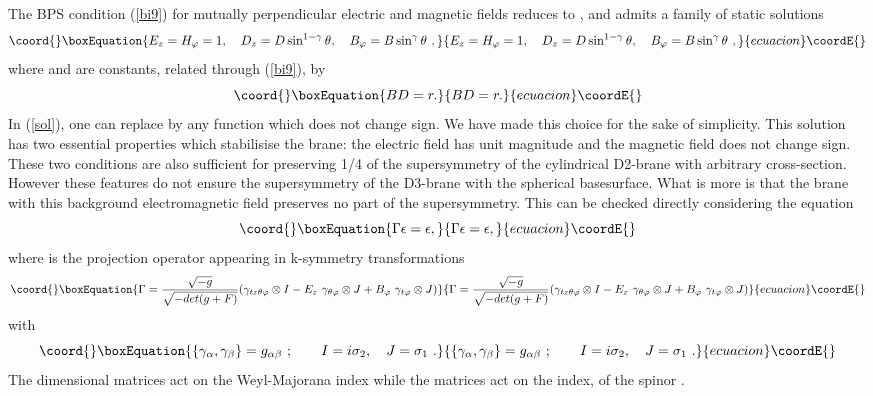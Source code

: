 \documentclass[a4paper,12pt]{article}
\begin{document}
The BPS condition (\ref{bi9}) for mutually perpendicular electric and magnetic fields reduces to \coordHE{}, and admits a family of static solutions 
\begin{equation}\coord{}\boxEquation{
E_z=H_{\varphi} =1,\quad D_z=D\sin^{1-\gamma}\theta ,\quad 
B_{\varphi}=B\sin^{\gamma}\theta \ ,
\label{sol}
}{
E_z=H_{\varphi} =1,\quad D_z=D\sin^{1-\gamma}\theta ,\quad 
B_{\varphi}=B\sin^{\gamma}\theta \ ,
}{ecuacion}\coordE{}\end{equation}
where \coordHE{} and \coordHE{} are constants, related through (\ref{bi9}), by
\begin{equation}\coord{}\boxEquation{
BD=r.
\label{bps}
}{
BD=r.
}{ecuacion}\coordE{}\end{equation}
In (\ref{sol}), one can replace \myHighlight{$\sin^{\gamma}\theta$}\coordHE{} by any function \coordHE{} which does not change sign. We have made this choice for the sake of simplicity. This solution has two essential properties which stabilisise the brane: the electric field has unit magnitude and the magnetic field does not change sign. These two conditions are also sufficient for preserving 1/4 of the supersymmetry of the cylindrical D2-brane with arbitrary cross-section\cite{bak1, surp}. However these features do not ensure the supersymmetry of the D3-brane with the spherical basesurface. What is more is that the brane with this background electromagnetic field preserves no part of the supersymmetry. This can be checked directly considering the equation 
\begin{equation}\coord{}\boxEquation{
\Gamma\epsilon =\epsilon,
\label{k}
}{
\Gamma\epsilon =\epsilon,
}{ecuacion}\coordE{}\end{equation}
where \myHighlight{$\Gamma$}\coordHE{} is the projection operator appearing in k-symmetry transformations \cite{ced, bk}
\begin{equation}\coord{}\boxEquation{
\Gamma=
\frac{\sqrt{-g}}{\sqrt{-det(g+F)}}(\gamma_{tz\theta\varphi}\otimes I - 
E_z\ \gamma_{\theta\varphi}\otimes J +
B_{\varphi}\ \gamma_{t\varphi}\otimes J)
\label{g}
}{
\Gamma=
\frac{\sqrt{-g}}{\sqrt{-det(g+F)}}(\gamma_{tz\theta\varphi}\otimes I - 
E_z\ \gamma_{\theta\varphi}\otimes J +
B_{\varphi}\ \gamma_{t\varphi}\otimes J)
}{ecuacion}\coordE{}\end{equation}
with
\begin{equation}\coord{}\boxEquation{
\{\gamma_{\alpha},\gamma_{\beta}\}=g_{\alpha\beta}\ ;\qquad
I=i\sigma_2,\quad J=\sigma_1\ .
\label{ij}
}{
\{\gamma_{\alpha},\gamma_{\beta}\}=g_{\alpha\beta}\ ;\qquad
I=i\sigma_2,\quad J=\sigma_1\ .
}{ecuacion}\coordE{}\end{equation}
The \coordHE{} dimensional matrices \myHighlight{$\gamma_{\alpha}$}\coordHE{} act on the Weyl-Majorana index while the matrices \coordHE{} act on the \coordHE{} index, of the spinor \myHighlight{$\epsilon$}\coordHE{}.
\end{document}

